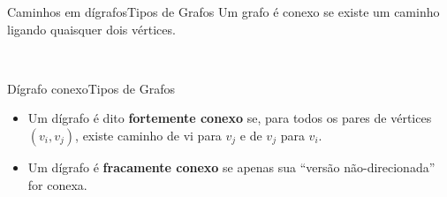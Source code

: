 \documentclass[t]{beamer}
\begin{document}

\begin{ftst}{Caminhos em dígrafos}{Tipos de Grafos}
Um grafo é conexo se existe um caminho ligando quaisquer dois vértices.
\vone

\vone
\centering
\\


\end{ftst}


\begin{ftst}{Dígrafo conexo}{Tipos de Grafos}
\begin{itemize}
    \item Um dígrafo é dito \textbf{fortemente conexo} se, para todos os pares de vértices $(v_i,v_j)$, existe caminho de vi para $v_j$ e de $v_j$ para $v_i$. 
    \item Um dígrafo é \textbf{fracamente conexo} se apenas sua “versão não-direcionada” for conexa.
\end{itemize}

\vone

\vone
\centering
\\


\end{ftst}

\end{document}
